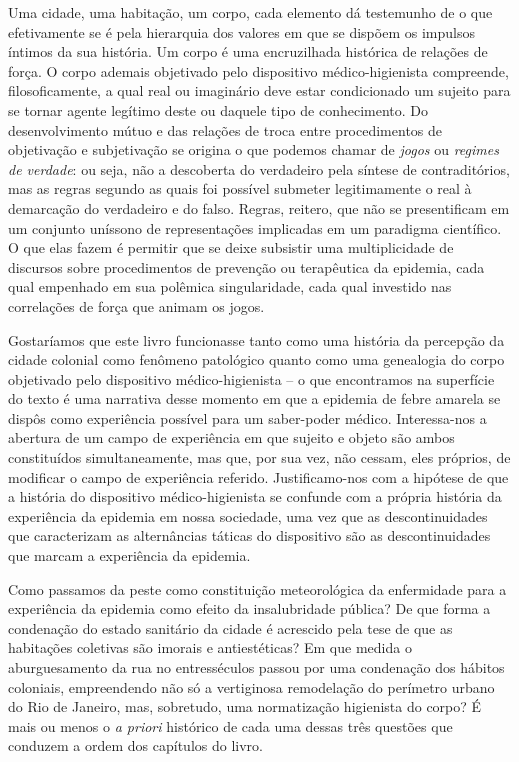 Uma cidade, uma habitação, um corpo, cada elemento dá testemunho de o
que efetivamente se é pela hierarquia dos valores em que se dispõem os
impulsos íntimos da sua história. Um corpo é uma encruzilhada histórica
de relações de força. O corpo ademais objetivado pelo dispositivo
médico-higienista compreende, filosoficamente, a qual real ou imaginário
deve estar condicionado um sujeito para se tornar agente legítimo deste
ou daquele tipo de conhecimento. Do desenvolvimento mútuo e das relações
de troca entre procedimentos de objetivação e subjetivação se origina o
que podemos chamar de \emph{jogos} ou \emph{regimes de verdade}: ou
seja, não a descoberta do verdadeiro pela síntese de contraditórios, mas
as regras segundo as quais foi possível submeter legitimamente o real à
demarcação do verdadeiro e do falso. Regras, reitero, que não se
presentificam em um conjunto uníssono de representações implicadas em um
paradigma científico. O que elas fazem é permitir que se deixe subsistir
uma multiplicidade de discursos sobre procedimentos de prevenção ou
terapêutica da epidemia, cada qual empenhado em sua polêmica
singularidade, cada qual investido nas correlações de força que animam
os jogos.

\asterisc{}

Gostaríamos que este livro funcionasse tanto como uma história da
percepção da cidade colonial como fenômeno patológico quanto como uma
genealogia do corpo objetivado pelo dispositivo médico-higienista -- o
que encontramos na superfície do texto é uma narrativa desse momento em
que a epidemia de febre amarela se dispôs como experiência possível para
um saber-poder médico. Interessa-nos a abertura de um campo de
experiência em que sujeito e objeto são ambos constituídos
simultaneamente, mas que, por sua vez, não cessam, eles próprios, de
modificar o campo de experiência referido. Justificamo-nos com a
hipótese de que a história do dispositivo médico-higienista se confunde
com a própria história da experiência da epidemia em nossa sociedade,
uma vez que as descontinuidades que caracterizam as alternâncias táticas
do dispositivo são as descontinuidades que marcam a experiência da
epidemia.

Como passamos da peste como constituição meteorológica da enfermidade
para a experiência da epidemia como efeito da insalubridade pública? De
que forma a condenação do estado sanitário da cidade é acrescido pela
tese de que as habitações coletivas são imorais e antiestéticas? Em que
medida o aburguesamento da rua no entresséculos passou por uma
condenação dos hábitos coloniais, empreendendo não só a vertiginosa
remodelação do perímetro urbano do Rio de Janeiro, mas, sobretudo, uma
normatização higienista do corpo? É mais ou menos o \emph{a priori}
histórico de cada uma dessas três questões que conduzem a ordem dos
capítulos do livro.

